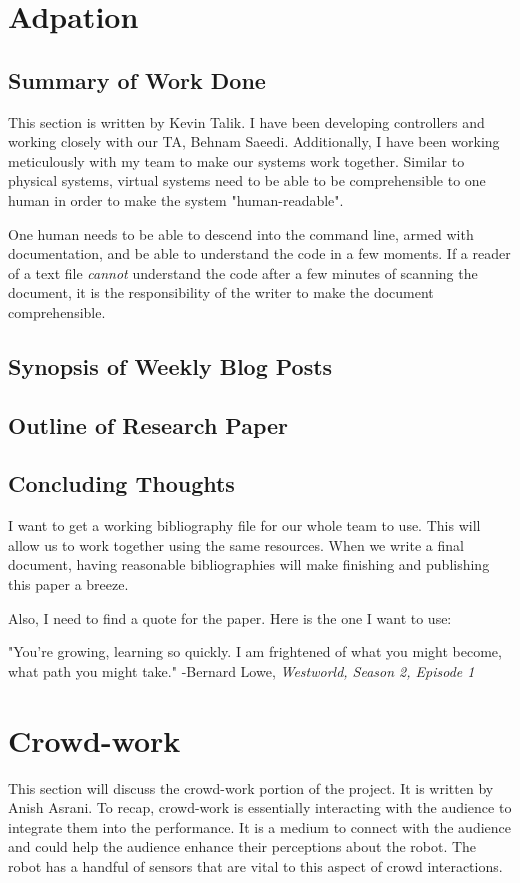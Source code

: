 \documentclass[onecolumn, draftclsnofoot,10pt, compsoc]{IEEEtran}
\begin{document}
\section{Adpation}
\subsection{Summary of Work Done}
 This section is written by Kevin Talik. I have been developing controllers and working closely with our TA, Behnam Saeedi. Additionally, I have been working meticulously with my team to make our systems work together. Similar to physical systems, virtual systems need to be able to be comprehensible to one human in order to make the system "human-readable".

 One human needs to be able to descend into the command line, armed with documentation, and be able to understand the code in a few moments. If a reader of a text file \textit{cannot} understand the code after a few minutes of scanning the document, it is the responsibility of the writer to make the document comprehensible.
 \subsection{Synopsis of Weekly Blog Posts}


\subsection{Outline of Research Paper}
\subsection{Concluding Thoughts}
 I want to get a working bibliography file for our whole team to use. This will allow us to work together using the same resources. When we write a final document, having reasonable bibliographies will make finishing and publishing this paper a breeze.


 Also, I need to find a quote for the paper. Here is the one I want to use:


 \begin{displayquote}
	 "You're growing, learning so quickly. I am frightened of what you might become, what path you might take."
	 -Bernard Lowe, \textit{Westworld, Season 2, Episode 1}
 \end{displayquote}

\section{Crowd-work}
This section will discuss the crowd-work portion of the project. It is written by Anish Asrani. To recap, crowd-work is essentially interacting with the audience to integrate them into the performance. It is a medium to connect with the audience and could help the audience enhance their perceptions about the robot. The robot has a handful of sensors that are vital to this aspect of crowd interactions. 
\end{document}
